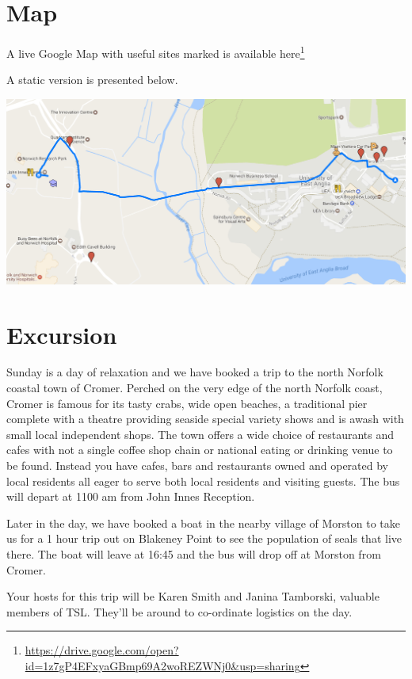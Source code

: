 \documentclass[12pt,]{book}
\let\rmarkdownfootnote\footnote%
\def\footnote{\protect\rmarkdownfootnote}
\renewcommand{\href}[2]{#2\footnote{\url{#1}}}
\theoremstyle{definition}
\theoremstyle{definition}
\theoremstyle{remark}
\begin{document}
\section*{Map}\label{map}

A live Google Map with useful sites marked is available
\href{https://drive.google.com/open?id=1z7gP4EFxyaGBmp69A2woREZWNj0\&usp=sharing}{here}

A static version is presented below.

\includegraphics[width=6.11in]{assets/large_map}

\section*{Excursion}\label{excursion}

Sunday is a day of relaxation and we have booked a trip to the north
Norfolk coastal town of Cromer. Perched on the very edge of the north
Norfolk coast, Cromer is famous for its tasty crabs, wide open beaches,
a traditional pier complete with a theatre providing seaside special
variety shows and is awash with small local independent shops. The town
offers a wide choice of restaurants and cafes with not a single coffee
shop chain or national eating or drinking venue to be found. Instead you
have cafes, bars and restaurants owned and operated by local residents
all eager to serve both local residents and visiting guests. The bus
will depart at 1100 am from John Innes Reception.

Later in the day, we have booked a boat in the nearby village of Morston
to take us for a 1 hour trip out on Blakeney Point to see the population
of seals that live there. The boat will leave at 16:45 and the bus will
drop off at Morston from Cromer.

Your hosts for this trip will be Karen Smith and Janina Tamborski,
valuable members of TSL. They'll be around to co-ordinate logistics on
the day.


\end{document}
